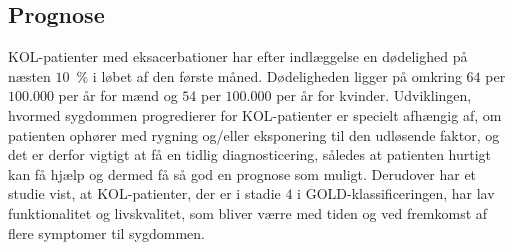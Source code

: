 \subsection{Prognose}
KOL-patienter med eksacerbationer har efter indlæggelse en dødelighed på næsten $10$~$\%$ i løbet af den første måned. Dødeligheden ligger på omkring $64$ per $100.000$ per år for mænd og $54$ per $100.000$ per år for kvinder.
Udviklingen, hvormed sygdommen progredierer for KOL-patienter er specielt afhængig af, om patienten ophører med rygning og/eller eksponering til den udløsende faktor, og det er derfor vigtigt at få en tidlig diagnosticering, således at patienten hurtigt kan få hjælp og dermed få så god en prognose som muligt. \cite{dsam2016}
Derudover har et studie vist, at KOL-patienter, der er i stadie $4$ i GOLD-klassificeringen, har lav funktionalitet og livskvalitet, som bliver værre med tiden og ved fremkomst af flere symptomer til sygdommen. \cite{Habraken2011}

